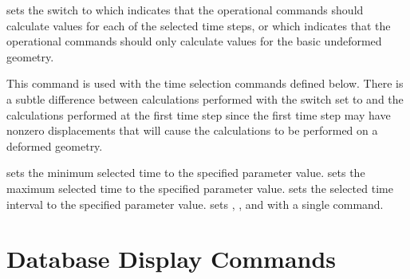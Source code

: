 \filbreak
{} {
 sets the  switch to  which indicates
that the operational commands should calculate values for each of the
selected time steps, or  which indicates that the operational
commands should only calculate values for the basic undeformed geometry. 

This command is used with the time selection commands defined below.
There is a subtle difference between calculations performed with the
 switch set to  and the calculations performed at
the first time step since the first time step may have nonzero
displacements that will cause the calculations to be performed on a
deformed geometry.
}

 {
 sets the minimum selected time  to the specified
parameter value. 
}
\filbreak
{} {
 sets the maximum selected time  to the specified
parameter value. 
}
\filbreak
{} {
 sets the selected time interval  to the
specified parameter value.
}
\filbreak
{} {
 sets , , and 
 with a single command.
}
\filbreak
\section{Database Display Commands}
\label{cmd:display}

